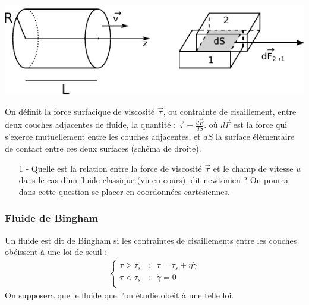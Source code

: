 \documentclass{report}
\begin{document}
\begin{center}
	\includegraphics[scale=0.8]{meca_flu2.pdf}
\end{center}

On définit la force surfacique de viscosité $\vec{\tau}$, ou contrainte de cisaillement, entre deux couches adjacentes de fluide, la quantité : $\vec{\tau}=\frac{d\vec{F}}{dS}$.
où $d\vec{F}$ est la force qui s'exerce mutuellement entre les couches adjacentes, et $dS$ la surface élémentaire de contact entre ces deux surfaces (schéma de droite).

\begin{itemize}
	\item[1 - ] Quelle est la relation entre la force de viscosité $\vec{\tau}$ et le champ de vitesse $u$ dans le cas d'un fluide classique (vu en cours), dit newtonien ? On pourra dans cette question se placer en coordonnées cartésiennes.
	
\end{itemize}

\subsubsection*{Fluide de Bingham}

Un fluide est dit de Bingham si les contraintes de cisaillements entre les couches obéissent à une loi de seuil : 
\begin{align*}
	\left\lbrace
\begin{array}{ccc}
\tau>\tau_s & : & \tau = \tau_s+\eta\dot{\gamma} \\
\tau<\tau_s & : & \dot{\gamma}=0\\
\end{array}\right.
\end{align*}
On supposera que le fluide que l'on étudie obéit à une telle loi. 
\end{document}
